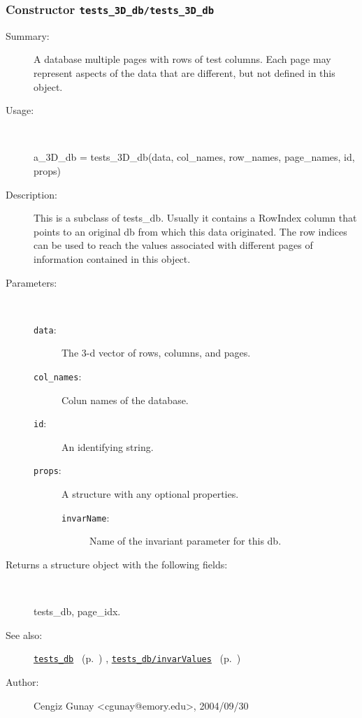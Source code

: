 \subsubsection[Constructor \texttt{tests\_3D\_db}]{Constructor \texttt{tests\_3D\_db/tests\_3D\_db}}%
%
\label{ref_tests_3D_db__tests_3D_db}%
\hypertarget{ref_tests_3D_db__tests_3D_db}{}%
\begin{description}
\item[Summary:]A database multiple pages with rows of test columns. 
		Each page may represent aspects of the data that are
		different, but not defined in this object.
%
\item[Usage:]~%
\begin{lyxcode}%
a\_3D\_db = tests\_3D\_db(data, col\_names, row\_names, page\_names, id, props)
%
\end{lyxcode}%
%
\item[Description:]%
This is a subclass of tests\_db. Usually it contains a RowIndex
 column that points to an original db from which this data originated. 
 The row indices can be used to reach the values associated with different
 pages of information contained in this object.
\item[Parameters:]~
\begin{description}%
\item[\texttt{data}:]
 The 3-d vector of rows, columns, and pages.
\item[\texttt{col\_names}:]
 Colun names of the database.
\item[\texttt{id}:]
 An identifying string.
\item[\texttt{props}:]
 A structure with any optional properties.
\begin{description}%
\item[\texttt{invarName}:]
 Name of the invariant parameter for this db.
\end{description}%
\end{description}%
%
\item[Returns a structure object with the following fields:]~

	tests\_db, page\_idx.
%
%
\item[See also:]%
\hyperlink{ref_tests_db}{\texttt{tests\_db}}%
\ (p.~\pageref{ref_tests_db})%
%
, \hyperlink{ref_tests_db__invarValues}{\texttt{tests\_db/invarValues}}%
\ (p.~\pageref{ref_tests_db__invarValues})%
%
%
\item[Author:]%
Cengiz Gunay <cgunay@emory.edu>, 2004/09/30%
\end{description}
\methodline%
